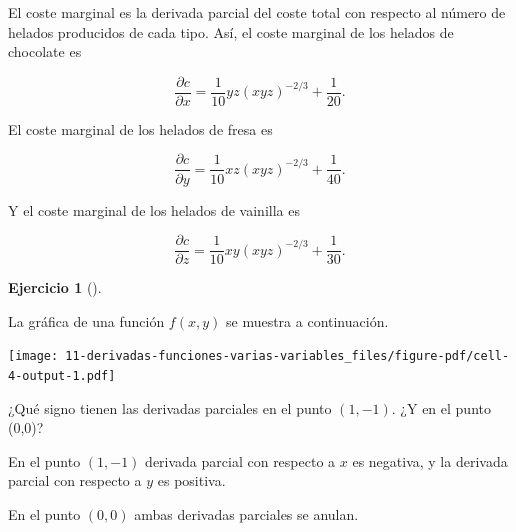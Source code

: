 \documentclass[
  a4paper,
]{scrreport}
\theoremstyle{definition}
\newtheorem{exercise}{Ejercicio}[chapter]
\theoremstyle{remark}
\begin{document}
\begin{tcolorbox}[enhanced jigsaw, bottomrule=.15mm, breakable, colframe=quarto-callout-tip-color-frame, toprule=.15mm, opacityback=0, left=2mm, opacitybacktitle=0.6, colback=white, toptitle=1mm, titlerule=0mm, bottomtitle=1mm, arc=.35mm, title=\textcolor{quarto-callout-tip-color}{\faLightbulb}\hspace{0.5em}{Solución}, rightrule=.15mm, colbacktitle=quarto-callout-tip-color!10!white, leftrule=.75mm, coltitle=black]

El coste marginal es la derivada parcial del coste total con respecto al
número de helados producidos de cada tipo. Así, el coste marginal de los
helados de chocolate es

\[
\frac{\partial c}{\partial x} = \frac{1}{10}yz(xyz)^{-2/3} + \frac{1}{20}.
\]

El coste marginal de los helados de fresa es

\[
\frac{\partial c}{\partial y} = \frac{1}{10}xz(xyz)^{-2/3} + \frac{1}{40}.
\]

Y el coste marginal de los helados de vainilla es

\[
\frac{\partial c}{\partial z} = \frac{1}{10}xy(xyz)^{-2/3} + \frac{1}{30}.
\]

\end{tcolorbox}

\begin{exercise}[]\protect\hypertarget{exr-interpretacion-derivadas-parciales-superficie}{}\label{exr-interpretacion-derivadas-parciales-superficie}

La gráfica de una función \(f(x,y)\) se muestra a continuación.

\texttt{[image: 11-derivadas-funciones-varias-variables\_files/figure-pdf/cell-4-output-1.pdf]}

¿Qué signo tienen las derivadas parciales en el punto \((1,-1)\). ¿Y en
el punto (0,0)?

\end{exercise}

\begin{tcolorbox}[enhanced jigsaw, bottomrule=.15mm, breakable, colframe=quarto-callout-tip-color-frame, toprule=.15mm, opacityback=0, left=2mm, opacitybacktitle=0.6, colback=white, toptitle=1mm, titlerule=0mm, bottomtitle=1mm, arc=.35mm, title=\textcolor{quarto-callout-tip-color}{\faLightbulb}\hspace{0.5em}{Solución}, rightrule=.15mm, colbacktitle=quarto-callout-tip-color!10!white, leftrule=.75mm, coltitle=black]

En el punto \((1,-1)\) derivada parcial con respecto a \(x\) es
negativa, y la derivada parcial con respecto a \(y\) es positiva.

En el punto \((0,0)\) ambas derivadas parciales se anulan.

\end{tcolorbox}
\end{document}
